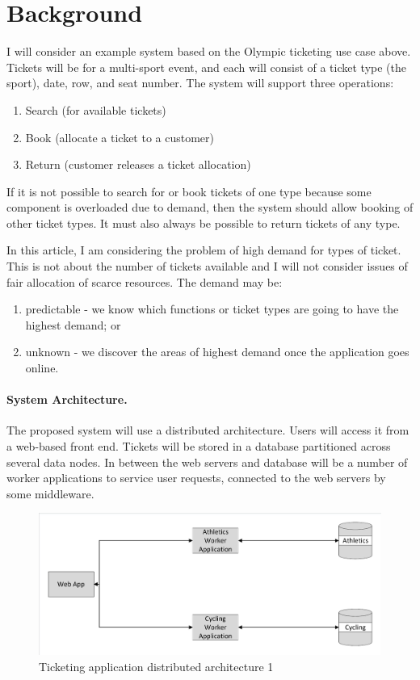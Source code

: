\documentclass{llncs}
\begin{document}
%
%

\section{Background}

I will consider an example system based on the Olympic ticketing use case above.  Tickets will be for a multi-sport event, and each will consist of a ticket type (the sport), date, row, and seat number.  The system will support three operations:
\begin{enumerate}
\item Search (for available tickets)
\item Book (allocate a ticket to a customer)
\item Return (customer releases a ticket allocation)
\end{enumerate}

If it is not possible to search for or book tickets of one type because some component is overloaded due to demand, then the system should allow booking of other ticket types.  It must also always be possible to return tickets of any type.

In this article, I am considering the problem of high demand for types of ticket.  This is not about the number of tickets available and I will not consider issues of fair allocation of scarce resources.  The demand may be:
\begin{enumerate}
\item predictable - we know which functions or ticket types are going to have the highest demand; or
\item unknown - we discover the areas of highest demand once the application goes online.
\end{enumerate}

\paragraph{System Architecture.}

The proposed system will use a distributed architecture.  Users will access it from a web-based front end.  Tickets will be stored in a database partitioned across several data nodes.  In between the web servers and database will be a number of worker applications to service user requests, connected to the web servers by some middleware.

\begin{figure}
	\caption{Ticketing application distributed architecture 1}
	\centering
	\includegraphics[trim = 5 5 5 5, clip, width=\textwidth]{img/simplemicro}
\end{figure}
\end{document}
